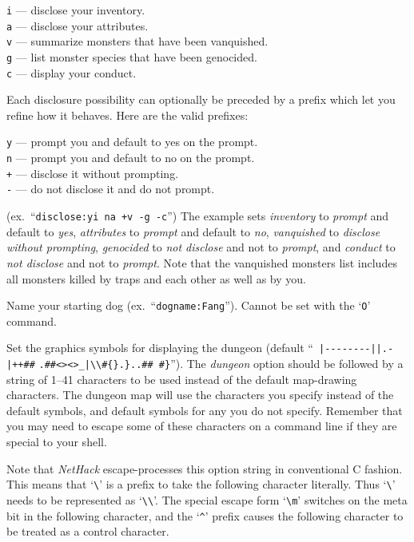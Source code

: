 {\tt i} --- disclose your inventory.\\
{\tt a} --- disclose your attributes.\\
{\tt v} --- summarize monsters that have been vanquished.\\
{\tt g} --- list monster species that have been genocided.\\
{\tt c} --- display your conduct.

Each disclosure possibility can optionally be preceded by a prefix which
let you refine how it behaves. Here are the valid prefixes:

{\tt y} --- prompt you and default to yes on the prompt.\\
{\tt n} --- prompt you and default to no on the prompt.\\
{\tt +} --- disclose it without prompting.\\
{\tt -} --- do not disclose it and do not prompt.

(ex.\ ``{\tt disclose:yi na +v -g -c}'')
The example sets {\it inventory\/} to {\it prompt\/} and default to {\it yes\/}, 
{\it attributes\/} to {\it prompt\/} and default to {\it no\/}, 
{\it vanquished\/} to {\it disclose without prompting\/}, 
{\it genocided\/} to {\it not disclose\/} and not to {\it prompt\/}, and 
{\it conduct\/} to {\it not disclose\/} and not to {\it prompt\/}.
Note that the vanquished monsters list includes all monsters killed by
traps and each other as well as by you. 
\item[\ib{dogname}]
Name your starting dog (ex.\ ``{\tt dogname:Fang}'').
Cannot be set with the `{\tt O}' command.
\item[\ib{dungeon}]
Set the graphics symbols for displaying the dungeon (default
``\verb& |--------||.-|++##& \verb&.##<><>_|\\#{}.}..## #}&'').
The {\it dungeon\/} option should be
followed by a string of 1--41
characters to be used instead of the default map-drawing characters.
The dungeon map will use the characters you specify instead of the
default symbols, and default symbols for any you do not specify.
Remember that you may need to escape some of these characters
on a command line if they are special to your shell.

Note that {\it NetHack\/} escape-processes this option string in conventional C
fashion.  This means that `\verb+\+' is a prefix to take the following
character literally.  Thus `\verb+\+' needs to be represented as `\verb+\\+'.
The special escape form
`\verb+\m+' switches on the meta bit in the following character, and the
`{\tt \^{}}' prefix causes the following character to be treated as a control
character.


